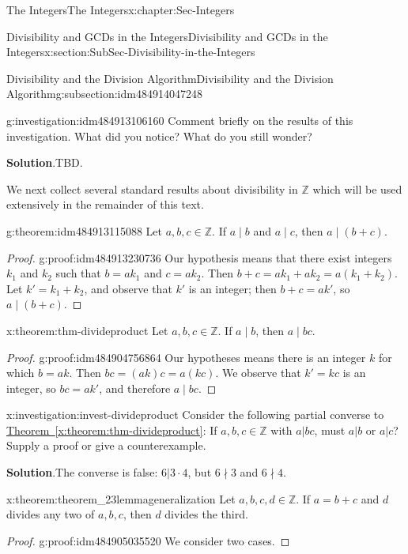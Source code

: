 \documentclass[oneside,10pt,]{book}
\newcommand{\blocktitlefont}{\relax}
\newcommand{\xreffont}{\relax}
\numberwithin{equation}{section}
\def\Z{{\mathbb Z}}
\begin{document}
\begin{chapterptx}{The Integers}{}{The Integers}{}{}{x:chapter:Sec-Integers}
\begin{sectionptx}{Divisibility and GCDs in the Integers}{}{Divisibility and GCDs in the Integers}{}{}{x:section:SubSec-Divisibility-in-the-Integers}
\begin{subsectionptx}{Divisibility and the Division Algorithm}{}{Divisibility and the Division Algorithm}{}{}{g:subsection:idm484914047248}
\begin{investigation}{}{g:investigation:idm484913106160}
Comment briefly on the results of this investigation. What did you notice? What do you still wonder?%
\par\smallskip%
\noindent\textbf{\blocktitlefont Solution}.\hypertarget{g:solution:idm484913052336}{}\quad{}TBD.%
\end{investigation}
We next collect several standard results about divisibility in \(\Z\) which will be used extensively in the remainder of this text.%
\begin{theorem}{}{}{g:theorem:idm484913115088}%
Let \(a,b,c\in\Z\). If \(a\mid b\) and \(a\mid c\), then \(a\mid (b+c)\).%
\end{theorem}
\begin{proof}{}{g:proof:idm484913230736}
Our hypothesis means that there exist integers \(k_1\) and \(k_2\) such that \(b = a k_1\) and \(c = a k_2\). Then \(b+c = a k_1 + a k_2 = a(k_1 + k_2)\). Let \(k' = k_1 + k_2\), and observe that \(k'\) is an integer; then \(b+c = a k'\), so \(a\mid (b+c)\).%
\end{proof}
\begin{theorem}{}{}{x:theorem:thm-divideproduct}%
Let \(a,b,c\in\Z\). If \(a\mid b\), then \(a\mid bc\).%
\end{theorem}
\begin{proof}{}{g:proof:idm484904756864}
Our hypotheses means there is an integer \(k\) for which \(b = ak\). Then \(bc = (ak)c = a(kc)\). We observe that \(k' = kc\) is an integer, so \(bc = ak'\), and therefore \(a\mid bc\).%
\end{proof}
\begin{investigation}{}{x:investigation:invest-divideproduct}%
Consider the following partial converse to \hyperref[x:theorem:thm-divideproduct]{Theorem~{\xreffont\ref{x:theorem:thm-divideproduct}}}: If \(a,b,c\in\Z\) with \(a|bc\), must \(a|b\) or \(a|c\)? Supply a proof or give a counterexample.%
\par\smallskip%
\noindent\textbf{\blocktitlefont Solution}.\hypertarget{g:solution:idm484904879472}{}\quad{}The converse is false: \(6| 3\cdot 4\), but \(6\nmid 3\) and \(6\nmid 4\).%
\end{investigation}
\begin{theorem}{}{}{x:theorem:theorem_23lemmageneralization}%
Let \(a,b,c,d\in \Z\). If \(a = b+c\) and \(d\) divides any two of \(a,b,c\), then \(d\) divides the third.%
\end{theorem}
\begin{proof}{}{g:proof:idm484905035520}
We consider two cases.%
\par

\end{proof}
\end{subsectionptx}
\end{sectionptx}
\end{chapterptx}
\end{document}
